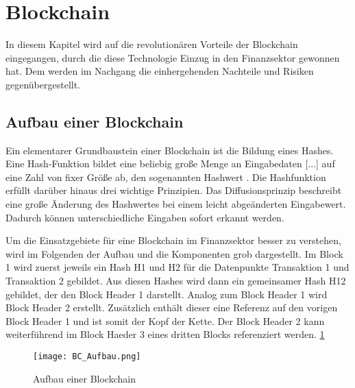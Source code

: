 \section{Blockchain}
In diesem Kapitel wird auf die revolutionären Vorteile der Blockchain 
eingegangen, durch die diese Technologie Einzug in den Finanzsektor gewonnen 
hat. Dem werden im Nachgang die einhergehenden Nachteile und Risiken gegenübergestellt. 

\subsection{Aufbau einer Blockchain}
Ein elementarer Grundbaustein einer Blockchain ist die Bildung eines Hashes.
\glqq Eine Hash-Funktion bildet eine beliebig große Menge an Eingabedaten [...] auf eine Zahl von 
fixer Größe ab, den sogenannten Hashwert\grqq{} \cite[p.~6]{fill2020blockchain}.
Die Hashfunktion erfüllt darüber hinaus drei wichtige Prinzipien.
Das Diffusionsprinzip beschreibt eine große Änderung des Hashwertes bei einem leicht
abgeänderten Eingabewert. Dadurch können unterschiedliche Eingaben sofort erkannt werden.
\cite[p.~6ff]{fill2020blockchain}

Um die Einsatzgebiete für eine Blockchain im Finanzsektor besser zu verstehen,
wird im Folgenden der Aufbau und die Komponenten grob dargestellt.
Im Block 1 wird zuerst jeweils ein Hash H1 und H2 für die Datenpunkte Transaktion 1 
und Transaktion 2 gebildet. Aus diesen Hashes wird dann ein gemeinsamer Hash H12 gebildet, 
der den Block Header 1 darstellt.
Analog zum Block Header 1 wird Block Header 2 erstellt. Zusätzlich enthält dieser eine
Referenz auf den vorigen Block Header 1 und ist somit der Kopf der Kette. Der Block Header 2
kann weiterführend im Block Haeder 3 eines dritten Blocks referenziert werden. 
\ref{fig:BC_Aufbau}
\cite[p.~17f]{fill2020blockchain}

\begin{figure}[h!]
    \texttt{[image: BC\_Aufbau.png]}
    \caption{Aufbau einer Blockchain}
    \label{fig:BC_Aufbau}
\end{figure}

\subsection{}